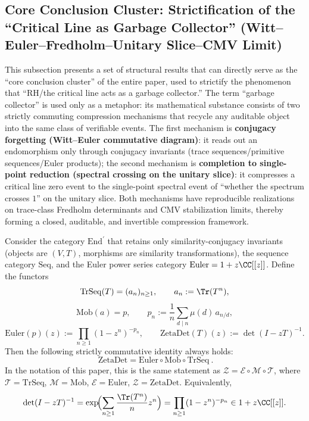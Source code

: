 \subsection{Core Conclusion Cluster: Strictification of the ``Critical Line as Garbage Collector'' (Witt--Euler--Fredholm--Unitary Slice--CMV Limit)}\label{subsec:discussion-rh-garbage-collector-core}
This subsection presents a set of structural results that can directly serve as the ``core conclusion cluster'' of the entire paper, used to strictify the phenomenon that ``RH/the critical line acts as a garbage collector.''
The term ``garbage collector'' is used only as a metaphor: its mathematical substance consists of two strictly commuting compression mechanisms that recycle any auditable object into the same class of verifiable events.
The first mechanism is \textbf{conjugacy forgetting (Witt--Euler commutative diagram)}: it reads out an endomorphism only through conjugacy invariants (trace sequences/primitive sequences/Euler products);
the second mechanism is \textbf{completion to single-point reduction (spectral crossing on the unitary slice)}: it compresses a critical line zero event to the single-point spectral event of ``whether the spectrum crosses \(1\)'' on the unitary slice.
Both mechanisms have reproducible realizations on trace-class Fredholm determinants and CMV stabilization limits, thereby forming a closed, auditable, and invertible compression framework.

\begin{theorem}\label{thm:discussion-witt-euler-gc-functor}
Consider the category \(\mathrm{End}^{\prime}\) that retains only similarity-conjugacy invariants (objects are \((V,T)\), morphisms are similarity transformations), the sequence category \(\mathrm{Seq}\), and the Euler power series category \(\mathrm{Euler}=1+z\CC[[z]]\).
Define the functors
\[
\mathrm{TrSeq}(T)=(a_n)_{n\ge 1},\qquad a_n:=\Tr(T^n),
\]
\[
\mathrm{Mob}(a)=p,\qquad p_n:=\frac{1}{n}\sum_{d\mid n}\mu(d)\,a_{n/d},
\]
\[
\mathrm{Euler}(p)(z):=\prod_{n\ge 1}(1-z^n)^{-p_n},
\qquad
\mathrm{ZetaDet}(T)(z):=\det(I-zT)^{-1}.
\]
Then the following strictly commutative identity always holds:
\[
\boxed{\ \mathrm{ZetaDet}=\mathrm{Euler}\circ\mathrm{Mob}\circ\mathrm{TrSeq}\ }.
\]
In the notation of this paper, this is the same statement as \(\mathcal Z=\mathcal E\circ\mathcal M\circ\mathcal T\), where \(\mathcal T=\mathrm{TrSeq}\), \(\mathcal M=\mathrm{Mob}\), \(\mathcal E=\mathrm{Euler}\), \(\mathcal Z=\mathrm{ZetaDet}\).
Equivalently,
\[
\det(I-zT)^{-1}
=\exp\!\Bigl(\sum_{n\ge 1}\frac{\Tr(T^n)}{n}z^n\Bigr)
=\prod_{n\ge 1}(1-z^n)^{-p_n}\in 1+z\CC[[z]].
\]
\end{theorem}

